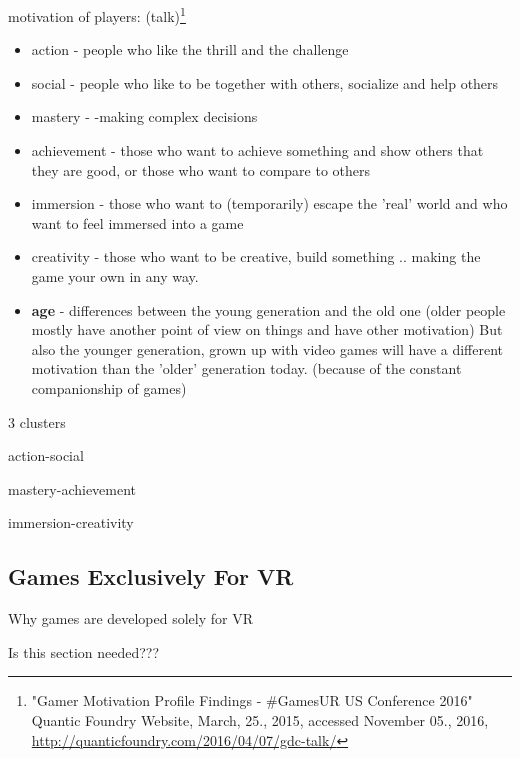 motivation of players: (talk)\footnote{"Gamer Motivation Profile Findings - \#GamesUR US Conference 2016" Quantic Foundry Website, March, 25., 2015, accessed November 05., 2016, \url{http://quanticfoundry.com/2016/04/07/gdc-talk/}}
\begin{itemize}
	\item action - people who like the thrill and the challenge
	\item social - people who like to be together with others, socialize and help others
	\item mastery - -making complex decisions
	\item achievement - those who want to achieve something and show others that they are good, or those who want to compare to others
	\item immersion - those who want to (temporarily) escape the 'real' world and who want to feel immersed into a game
	\item creativity - those who want to be creative, build something .. making the game your own in any way. 
	\item \textbf{age} - differences between the young generation and the old one (older people mostly have another point of view on things and have other motivation) But also the younger generation, grown up with video games will have a different motivation than the 'older' generation today. (because of the constant companionship of games)
\end{itemize}

3 clusters 

action-social

mastery-achievement

immersion-creativity

\subsection{Games Exclusively For VR}
Why games are developed solely for VR

Is this section needed???
